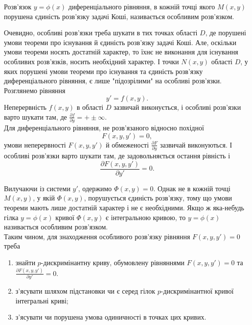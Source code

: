 \begin{definition}
	Розв’язок $y = \phi(x)$ диференціального рівняння, в кожній точці якого $M(x,y)$ порушена єдиність розв’язку задачі Коші, називається особливим розв’язком. 
\end{definition}

Очевидно, особливі розв’язки треба шукати в тих точках області $D$, де порушені умови теореми про існування й єдиність розв’язку задачі Коші. Але, оскільки умови теореми носять достатній характер, то їхнє не виконання для існування особливих розв’язків, носить необхідний характер. І точки $N(x,y)$ області $D$, у яких порушені умови теореми про існування та єдиність розв’язку диференціального рівняння, є лише "підозрілими" на особливі розв’язки. \\

Розглянемо рівняння 
\begin{equation*}
	y' = f(x,y).
\end{equation*}
Неперервність $f(x,y)$ в області $D$ зазвичай виконується, і особливі розв’язки варто шукати там, де $\frac{\partial f}{\partial y} = +\pm \infty$. \\

Для диференціального рівняння, не розв’язаного відносно похідної 
\begin{equation*}
	F(x, y, y') = 0,
\end{equation*}
умови неперервності $F(x,y,y')$ й обмеженості $\frac{\partial F}{\partial y}$ зазвичай виконуються. І особливі розв’язки варто шукати там, де задовольняється остання рівність і 
\begin{equation*}
	\frac{\partial F(x,y,y')}{\partial y'} = 0.
\end{equation*}

Вилучаючи із системи $y'$, одержимо $\Phi(x,y)=0$. Однак не в кожній точці $M(x,y)$, у якій $\Phi(x,y)$, порушується єдиність розв’язку, тому що умови теореми мають лише достатній характер і не є необхідними. Якщо ж яка-небудь гілка $y=\phi(x)$ кривої $\Phi(x,y)$ є інтегральною кривою, то $y=\phi(x)$ називається особливим розв’язком. \\

Таким чином, для знаходження особливого розв’язку рівняння $F(x, y, y') = 0$ треба
\begin{enumerate}
	\item знайти $p$-дискримінантну криву, обумовлену рівняннями $F(x, y, y') = 0$ та $\frac{\partial F(x,y,y')}{\partial y'} = 0$.
	\item з'ясувати шляхом підстановки чи є серед гілок $p$-дискримінантної кривої інтегральні криві;
	\item з'ясувати чи порушена умова одиничності в точках цих кривих.
\end{enumerate}
